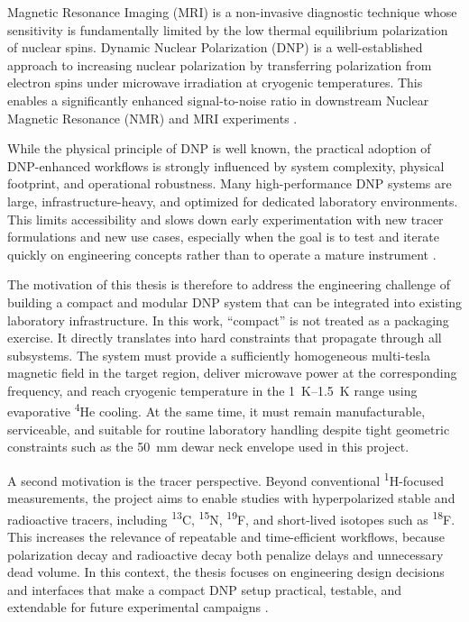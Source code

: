 \documentclass[FM,DP,EN,twoside]{tulthesis}
\begin{document}
Magnetic Resonance Imaging (MRI) is a non-invasive diagnostic technique whose sensitivity is fundamentally limited by the low thermal equilibrium polarization of nuclear spins. Dynamic Nuclear Polarization (DNP) is a well-established approach to increasing nuclear polarization by transferring polarization from electron spins under microwave irradiation at cryogenic temperatures. This enables a significantly enhanced signal-to-noise ratio in downstream Nuclear Magnetic Resonance (NMR) and MRI experiments \cite{dissolution_dnp_workflow_ref}.

While the physical principle of DNP is well known, the practical adoption of DNP-enhanced workflows is strongly influenced by system complexity, physical footprint, and operational robustness. Many high-performance DNP systems are large, infrastructure-heavy, and optimized for dedicated laboratory environments. This limits accessibility and slows down early experimentation with new tracer formulations and new use cases, especially when the goal is to test and iterate quickly on engineering concepts rather than to operate a mature instrument \cite{high_performance_DNP}.

The motivation of this thesis is therefore to address the engineering challenge of building a compact and modular DNP system that can be integrated into existing laboratory infrastructure. In this work, ``compact'' is not treated as a packaging exercise. It directly translates into hard constraints that propagate through all subsystems. The system must provide a sufficiently homogeneous multi-tesla magnetic field in the target region, deliver microwave power at the corresponding frequency, and reach cryogenic temperature in the \SIrange{1}{1.5}{\kelvin} range using evaporative \textsuperscript{4}He cooling. At the same time, it must remain manufacturable, serviceable, and suitable for routine laboratory handling despite tight geometric constraints such as the \SI{50}{\milli\meter} dewar neck envelope used in this project.

A second motivation is the tracer perspective. Beyond conventional \textsuperscript{1}H-focused measurements, the project aims to enable studies with hyperpolarized stable and radioactive tracers, including \textsuperscript{13}C, \textsuperscript{15}N, \textsuperscript{19}F, and short-lived isotopes such as \textsuperscript{18}F. This increases the relevance of repeatable and time-efficient workflows, because polarization decay and radioactive decay both penalize delays and unnecessary dead volume. In this context, the thesis focuses on engineering design decisions and interfaces that make a compact DNP setup practical, testable, and extendable for future experimental campaigns \cite{Kowalska2023MABudget}.
\end{document}
